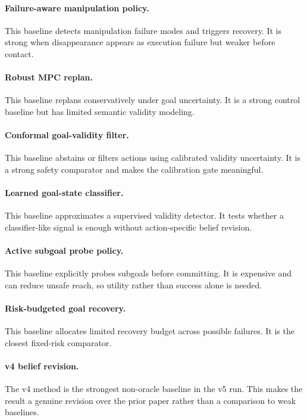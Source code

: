 \documentclass{article}
\begin{document}
\paragraph{Failure-aware manipulation policy.}
This baseline detects manipulation failure modes and triggers recovery. It is strong when disappearance appears as execution failure but weaker before contact.

\paragraph{Robust MPC replan.}
This baseline replans conservatively under goal uncertainty. It is a strong control baseline but has limited semantic validity modeling.

\paragraph{Conformal goal-validity filter.}
This baseline abstains or filters actions using calibrated validity uncertainty. It is a strong safety comparator and makes the calibration gate meaningful.

\paragraph{Learned goal-state classifier.}
This baseline approximates a supervised validity detector. It tests whether a classifier-like signal is enough without action-specific belief revision.

\paragraph{Active subgoal probe policy.}
This baseline explicitly probes subgoals before committing. It is expensive and can reduce unsafe reach, so utility rather than success alone is needed.

\paragraph{Risk-budgeted goal recovery.}
This baseline allocates limited recovery budget across possible failures. It is the closest fixed-risk comparator.

\paragraph{v4 belief revision.}
The v4 method is the strongest non-oracle baseline in the v5 run. This makes the result a genuine revision over the prior paper rather than a comparison to weak baselines.
\end{document}
